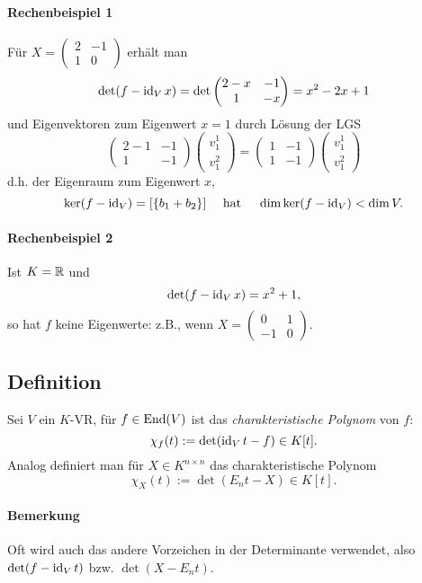 \paragraph{Rechenbeispiel 1}
	Für $ X = \begin{pmatrix}2&-1\\1&0\end{pmatrix} $ erhält man
		\[ \det(f-\operatorname{id}_Vx) = \det\begin{pmatrix}2-x&-1\\1&-x	\end{pmatrix} =x^2-2x+1 \]
	und Eigenvektoren zum Eigenwert $ x = 1 $ durch Lösung der LGS
		\[ \begin{pmatrix}
		2-1&-1\\1&-1
		\end{pmatrix}\begin{pmatrix}
		v_1^1\\v_1^2
		\end{pmatrix} =  \begin{pmatrix}
		1&-1\\1&-1
		\end{pmatrix}\begin{pmatrix}
		v_1^1\\v_1^2
		\end{pmatrix} \]
	d.h. der Eigenraum zum Eigenwert $ x $,
		\[ \ker(f-\operatorname{id}_V) = [\{b_1+b_2\}]\quad \text{ hat }\quad\dim \ker(f-\operatorname{id}_V)<\dim V. \]
\paragraph{Rechenbeispiel 2}
	Ist $ K=\mathbb{R} $ und
		\[ \det(f-\operatorname{id}_Vx)=x^2+1, \]
	so hat $ f $ keine Eigenwerte: z.B., wenn
		$ X=\begin{pmatrix} 0&1\\-1&0 \end{pmatrix} $.
		
\subsection{Definition} 
\begin{Definition}
	Sei $ V $ ein $ K $-VR, für $ f\in\operatorname{End}(V) $ ist das \emph{charakteristische Polynom} von $ f $:
		\[ \chi_f(t) := \det (\operatorname{id}_Vt-f)\in K[t]. \]
	Analog definiert man für $ X\in K^{n\times n} $ das charakteristische Polynom
		\[ \chi_X(t) := \det (E_nt-X)\in K[t]. \]
\end{Definition}
\paragraph{Bemerkung}
	Oft wird auch das andere Vorzeichen in der Determinante verwendet, also $ \det(f-\operatorname{id}_Vt) $ bzw. $ \det(X-E_nt) $.
